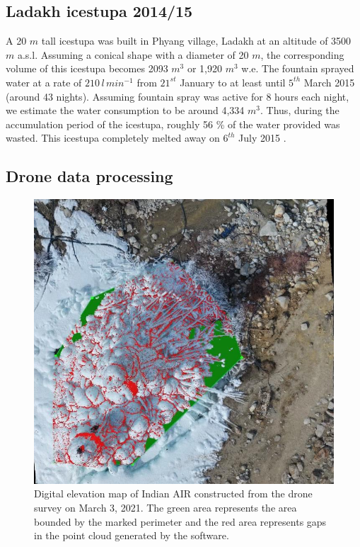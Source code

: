 \documentclass[utf8]{frontiersSCNS}
\begin{document}
\subsection{Ladakh icestupa 2014/15} \label{sec:ladakhloss}

A 20 $m$ tall icestupa \citep{iceheight} was built in Phyang village, Ladakh at an altitude of 3500 $m$ a.s.l.
Assuming a conical shape with a diameter of 20 $m$, the corresponding volume of this icestupa becomes 2093 $m^3$ or
1,920 $m^3$ w.e. The fountain sprayed water at a rate of $210\, l\,min^{-1}$ \citep{waterinput} from $21^{st}$
January \citep{waterstart} to at least until $5^{th}$ March 2015 \citep{waterend} (around 43 nights). Assuming
fountain spray was active for 8 hours each night, we estimate the water consumption to be around 4,334 $m^3$. Thus,
during the accumulation period of the icestupa, roughly 56 \% of the water provided was wasted.  This icestupa
completely melted away on $6^{th}$ July 2015 \citep{iceends}.

\subsection{Drone data processing} \label{sec:uav}

\begin{figure}
	\begin{center}
		\includegraphics[width=10 cm]{Figures/Figure_8.jpg}
	\end{center}
	\caption{Digital elevation map of Indian AIR constructed from the drone survey on March 3, 2021. The green
		area represents the area bounded by the marked perimeter and the red area represents gaps in the point cloud
    generated by the software.
	}
	\label{fig:DEM}
\end{figure}
\end{document}
